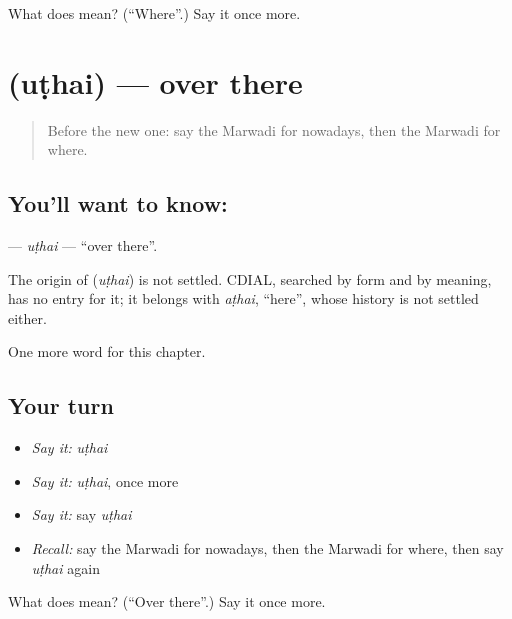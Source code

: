 \begin{tcolorbox}[breakable,colback=teal!4,colframe=teal!35!black,title={Before you move on}]
What does  mean? (\textquotedblleft{}Where\textquotedblright{}.) Say it once more.
\end{tcolorbox}
\section[\texorpdfstring{\mw{उठै} (uṭhai)}{उठै (uṭhai)}]{ (uṭhai) — over there}

\label{lesson:MW-C96-uthai}



\begin{quote}
Before the new one: say the Marwadi for nowadays, then the Marwadi for where.
\end{quote}

\subsection*{You'll want to know: }
\textbf{} — \emph{uṭhai} — \textquotedblleft{}over there\textquotedblright{}.

\begin{cousinweb}
The origin of \textbf{} (\emph{uṭhai}) is not settled. CDIAL, searched by form and by meaning, has no entry for it; it belongs with \emph{aṭhai}, \textquotedblleft{}here\textquotedblright{}, whose history is not settled either.
\end{cousinweb}

\begin{grammarlens}[title={What you've built}]
One more word for this chapter.
\end{grammarlens}

\subsection*{Your turn}
\begin{itemize}
\raggedright
  \item \emph{Say it:} \emph{uṭhai}
  \item \emph{Say it:} \emph{uṭhai}, once more
  \item \emph{Say it:} say \emph{uṭhai}
  \item \emph{Recall:} say the Marwadi for nowadays, then the Marwadi for where, then say \emph{uṭhai} again
\end{itemize}

\begin{tcolorbox}[breakable,colback=teal!4,colframe=teal!35!black,title={Before you move on}]
What does  mean? (\textquotedblleft{}Over there\textquotedblright{}.) Say it once more.
\end{tcolorbox}
